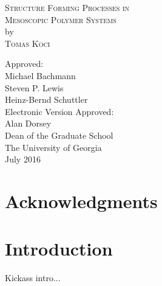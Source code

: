 \documentclass[12pt]{report}
\begin{document}
\newpage
\thispagestyle{empty}
\vspace*{18pt}
\begin{center}
\textsc{Structure Forming Processes in\\Mesoscopic Polymer Systems}\\[18pt]
by\\[18pt]
\textsc{Tomas Koci}
\end{center}
\vfill
\begin{flushleft}\singlespacing
\hskip 200pt {Approved:}\\
\vskip 12pt
\hspace*{200pt}Michael Bachmann\\
\vskip 12pt
\hspace*{200pt}Steven P. Lewis\\
\hspace*{200pt}\makebox[100pt][l]{~                }Heinz-Bernd Schuttler\\
\vfill
Electronic Version Approved:\\[12pt]
Alan Dorsey\\
Dean of the Graduate School\\
The University of Georgia\\
July 2016
\end{flushleft}



\chapter*{Acknowledgments}
\setcounter{page}{4}

\setcounter{tocdepth}{1}
\tableofcontents
\listoffigures  %
\listoftables %

\chapter{Introduction}
\setcounter{page}{1}
Kickass intro...
\end{document}
